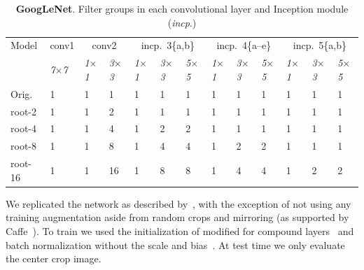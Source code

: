 \documentclass[thesis]{subfiles}
\begin{document}
	\begin{table}[tp]
		\caption[GoogLeNet Architectures]{\textbf{GoogLeNet}. Filter groups in each convolutional layer and Inception module (\textit{incp}.)}
		\label{table:googlenetconfig}
		\centering
		\begin{tabular}{@{}lm{1.6em}m{1.1em}m{1.1em}m{1.1em}m{1.1em}m{1.1em}m{1.1em}m{1.1em}m{1.1em}m{1.1em}m{1.1em}m{1.1em}@{}}
			\toprule
			Model & conv1 & \multicolumn{2}{c}{conv2} & \multicolumn{3}{c}{incp.~3\{a,b\}} & \multicolumn{3}{c}{incp.~4\{a--e\}} & \multicolumn{3}{c}{incp.~5\{a,b\}} \\
			& \textit{\footnotesize7$\times$7} & \textit{\footnotesize1$\times$1} & \textit{\footnotesize3$\times$3} & \textit{\footnotesize1$\times$1} & \textit{\footnotesize3$\times$3} & \textit{\footnotesize5$\times$5} & \textit{\footnotesize1$\times$1} & \textit{\footnotesize3$\times$3} & \textit{\footnotesize5$\times$5} & \textit{\footnotesize1$\times$1} & \textit{\footnotesize3$\times$3} & \textit{\footnotesize5$\times$5} \\
			Orig. & 1 &  1 &  1 & 1 & 1 & 1 & 1 & 1 & 1 & 1 & 1 & 1\\ 
			\midrule
			root-2 & 1 &  1 &  2 & 1 & 1 & 1 & 1 & 1 & 1 & 1 & 1 & 1\\
			root-4 & 1 &  1 &  4 & 1 & 2 & 2 & 1 & 1 & 1 & 1 & 1 & 1\\
			root-8 & 1 &  1 &  8 & 1 & 4 & 4 & 1 & 2 & 2 & 1 & 1 & 1\\
			root-16 & 1 &  1 & 16 & 1 & 8 & 8 & 1 & 4 & 4 & 1 & 2 & 2\\
			\bottomrule
		\end{tabular}
	\end{table}
	
	We replicated the network as described by~\citet{Szegedy2014going}, with the exception of not using any training augmentation aside from random crops and mirroring (as supported by Caffe~\cite{Jia2014}). To train we used the initialization of \citep{He2015b} modified for compound layers~\citep{Ioannou2016} and batch normalization without the scale and bias~\citep{Ioffe2015}. At test time we only evaluate the center crop image.
	
\end{document}
